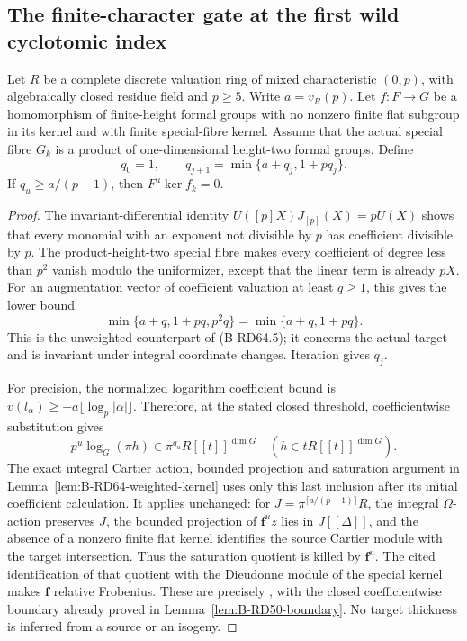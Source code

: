 \subsection{The finite-character gate at the first wild cyclotomic index}

\begin{lemma}
\label{lem:B-RD77-kernel}
Let \(R\) be a complete discrete valuation ring of mixed
characteristic \((0,p)\), with algebraically closed residue
field and \(p\ge5\). Write \(a=v_R(p)\). Let \(f:F\to G\)
be a homomorphism of finite-height formal groups with no nonzero
finite flat subgroup in its kernel and with finite special-fibre
kernel. Assume that the actual special fibre \(G_k\) is a product
of one-dimensional height-two formal groups. Define
\[
 q_0=1,\qquad q_{j+1}=\min\{a+q_j,1+pq_j\}.
                                                        \tag{B-RD77.1}
\]
If \(q_u\ge a/(p-1)\), then \(F^u\ker f_k=0\).
\end{lemma}
\begin{proof}
The invariant-differential identity
\(U([p]X)J_{[p]}(X)=pU(X)\) shows that every monomial with
an exponent not divisible by \(p\) has coefficient divisible
by \(p\). The product-height-two special fibre makes every
coefficient of degree less than \(p^2\) vanish modulo the
uniformizer, except that the linear term is already \(pX\).
For an augmentation vector of coefficient valuation at least
\(q\ge1\), this gives the lower bound
\[
 \min\{a+q,1+pq,p^2q\}
       =\min\{a+q,1+pq\}.                             \tag{B-RD77.2}
\]
This is the unweighted counterpart of (B-RD64.5); it concerns
the actual target and is invariant under integral coordinate
changes. Iteration gives \(q_j\).

For precision, the normalized logarithm coefficient bound is
\(v(l_\alpha)\ge-a\lfloor\log_p|\alpha|\rfloor\).
Therefore, at the stated closed threshold, coefficientwise
substitution gives
\[
       p^u\log_G(\pi h)\in\pi^{q_u}R[[t]]^{\dim G}
       \quad(h\in tR[[t]]^{\dim G}).                  \tag{B-RD77.3}
\]
The exact integral Cartier action, bounded projection and
saturation argument in Lemma~\ref{lem:B-RD64-weighted-kernel}
uses only this last inclusion after its initial coefficient
calculation. It applies unchanged: for
\(J=\pi^{\lceil a/(p-1)\rceil}R\), the integral
\(\Omega\)-action preserves \(J\), the bounded projection
of \(\mathbf f^u z\) lies in \(J[[\Delta]]\), and the
absence of a nonzero finite flat kernel identifies the source
Cartier module with the target intersection. Thus the saturation
quotient is killed by \(\mathbf f^u\). The cited identification
of that quotient with the Dieudonne module of the special kernel
makes \(\mathbf f\) relative Frobenius. These are precisely
\cite[Propositions~9--12 and Lemma~3, pp.~674--676;
Proposition~16 and proof, p.~681; Theorem~2(8), p.~668]
{Bondarko2006Generic}, with the closed coefficientwise boundary
already proved in Lemma~\ref{lem:B-RD50-boundary}.
No target thickness is inferred from a source or an isogeny.
\end{proof}

